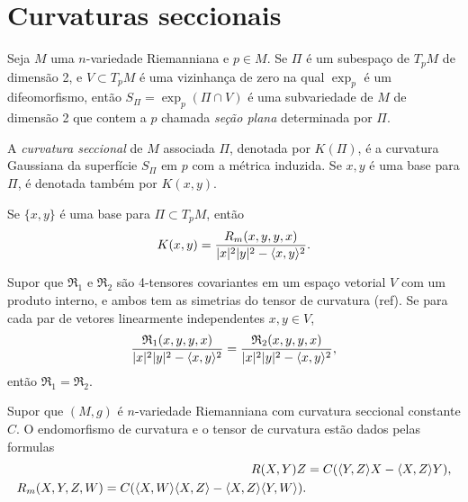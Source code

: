 \section{Curvaturas seccionais}

\begin{definicao}
	Seja $M$ uma $n$-variedade Riemanniana e $p \in M$. Se $\Pi$ é um subespaço de $T_p M$ de dimensão 2, e $V \subset T_p M$ é uma vizinhança de zero  na qual $\exp_p$ é um difeomorfismo, então $S_{\Pi} = \exp_p(\Pi \cap V)$ é uma subvariedade de $M$ de dimensão 2 que contem a  $p$ chamada \emph{seção plana} determinada por $\Pi$.
\end{definicao}

\begin{definicao}
	A \emph{curvatura seccional} de $M$ associada $\Pi$, denotada por $K(\Pi)$, é a curvatura Gaussiana da superfície $S_{\Pi}$ em $p$ com a métrica induzida. Se $x,y$ é uma base para $\Pi$, é denotada também por $K(x,y)$.
\end{definicao}

\begin{proposicao}
	Se $\{ x,y \}$ é uma base para $\Pi \subset T_p M$, então
	\begin{equation*}
		K(x,y) = \frac{R_m(x,y,y,x)}{|x|^2 |y|^2 - \langle x,y \rangle^2}.
	\end{equation*}
\end{proposicao}

\begin{lema}
	Supor que $\mathfrak{R}_1$ e $\mathfrak{R}_2$ são 4-tensores covariantes em um espaço vetorial $V$ com um produto interno, e ambos tem as simetrias do tensor de curvatura (ref). Se para cada par de vetores linearmente independentes $x,y \in V$,
	\begin{equation*}
		\frac{\mathfrak{R}_1(x,y,y,x)}{|x|^2 |y|^2 - \langle x,y \rangle^2} = \frac{\mathfrak{R}_2(x,y,y,x)}{|x|^2 |y|^2 - \langle x,y \rangle^2},
	\end{equation*}
	então $\mathfrak{R}_1 = \mathfrak{R}_2$.
\end{lema}

\begin{lema}
	Supor que $(M,g)$ é $n$-variedade Riemanniana com curvatura seccional constante $C$. O endomorfismo de curvatura e o tensor de curvatura estão dados pelas formulas
	\begin{align*}
		R(X,Y)Z &= C(\langle Y,Z \rangle X - \langle X,Z \rangle Y),\\
		R_m(X,Y,Z,W) = C(\langle X,W \rangle \langle X,Z \rangle - \langle X,Z \rangle \langle Y,W \rangle).
	\end{align*}
\end{lema}
